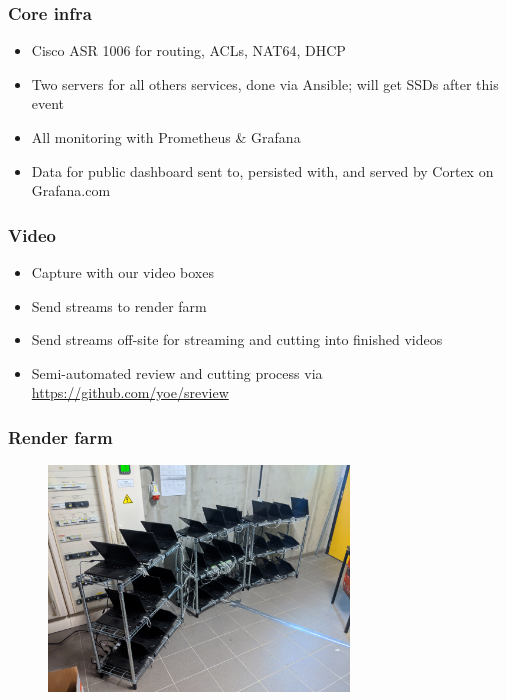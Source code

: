 \documentclass[aspectratio=169]{beamer}
\begin{document}
\begin{frame}
	\frametitle{Core infra}
	\vfill
	\begin{itemize}
		\item Cisco ASR 1006 for routing, ACLs, NAT64, DHCP
		\item Two servers for all others services, done via Ansible; will get SSDs after this event
		\item All monitoring with Prometheus \& Grafana
		\item Data for public dashboard sent to, persisted with, and served by Cortex on Grafana.com
	\end{itemize}
	\vfill
\end{frame}

\begin{frame}
	\frametitle{Video}
	\vfill
	\begin{itemize}
		\item Capture with our video boxes
		\item Send streams to render farm
		\item Send streams off-site for streaming and cutting into finished videos
		\item Semi-automated review and cutting process via \url{https://github.com/yoe/sreview}
	\end{itemize}
	\vfill
\end{frame}

\begin{frame}
	\frametitle{Render farm}
	\vfill
	\begin{figure}[ht!]
		\includegraphics[width=80mm]{render_farm.jpg}
	\end{figure}
	\vfill
\end{frame}
\end{document}
